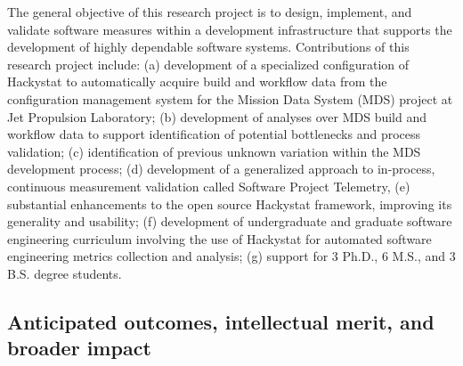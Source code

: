 The general objective of this  research project is to design,
implement, and validate software measures within a development
infrastructure that supports the development of highly dependable software
systems.  Contributions of this research project include: (a) development
of a specialized configuration of Hackystat to automatically acquire build
and workflow data from the configuration management system for the Mission
Data System (MDS) project at Jet Propulsion Laboratory; (b) development of
analyses over MDS build and workflow data to support identification of
potential bottlenecks and process validation; (c) identification of
previous unknown variation within the MDS development process; (d)
development of a generalized approach to in-process, continuous measurement
validation called Software Project Telemetry, (e) substantial enhancements
to the open source Hackystat framework, improving its generality and
usability; (f) development of undergraduate and graduate software
engineering curriculum involving the use of Hackystat for automated
software engineering metrics collection and analysis; (g) support for 3
Ph.D., 6 M.S., and 3 B.S. degree students.


\subsection{Anticipated outcomes, intellectual merit, and broader impact}
\label{sec:anticipated-outcomes}



